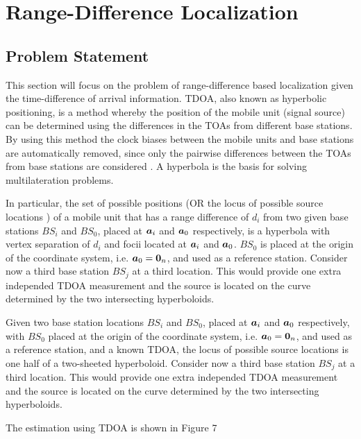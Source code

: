 
\section{Range-Difference Localization}

\subsection{Problem Statement}


This section will focus on the problem of range-difference based localization given the time-difference of arrival information. TDOA, also known as hyperbolic positioning, is a method whereby the position of the mobile unit (signal source) can be determined using the differences in the TOAs from different base stations. By using this method the clock biases between the mobile units and base stations are automatically removed, since only the pairwise differences between the TOAs from base stations are  considered \cite{LocAlg}. A hyperbola is the basis for solving multilateration problems. 

In particular, the set of possible positions (OR  the locus of possible source locations ) of a mobile unit that has a range difference of $d_i$ from two given base stations $BS_i$ and $BS_0$, placed at $\mbox{\boldmath$a$}_i$ and $\mbox{\boldmath$a$}_0$ respectively, is a hyperbola with vertex separation of $d_i$ and focii located at $\mbox{\boldmath$a$}_i$ and $\mbox{\boldmath$a$}_0$. $BS_0$ is placed at the origin of the coordinate system, i.e. $\mbox{\boldmath$a$}_0 = \mbox{\boldmath${0}$}_n$, and used as a reference station. Consider now a third base station $BS_j$ at a third location. This would provide one extra independed TDOA measurement and the source is located on the curve determined by the two intersecting hyperboloids.
 
 
Given two base station locations $BS_i$ and $BS_0$, placed at $\mbox{\boldmath$a$}_i$ and $\mbox{\boldmath$a$}_0$ respectively, with $BS_0$ placed at the origin of the coordinate system, i.e. $\mbox{\boldmath$a$}_0 = \mbox{\boldmath${0}$}_n$, and used as a reference station, and a known TDOA, the locus of possible source locations is one half of a two-sheeted hyperboloid. Consider now a third base station $BS_j$ at a third location. This would provide one extra independed TDOA measurement and the source is located on the curve determined by the two intersecting hyperboloids.


The estimation using TDOA is shown in Figure 7



